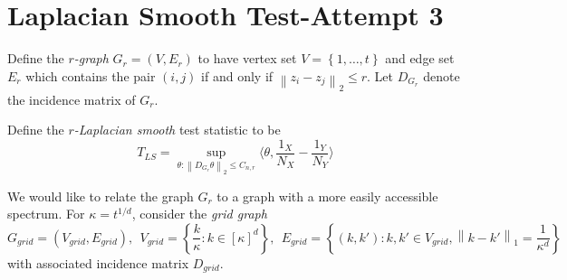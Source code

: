 \documentclass{article}
\newcommand{\norm}[1]{\left\lVert#1\right\rVert}
\newcommand{\set}[1]{\left\{#1\right\}}
\newcommand{\dotp}[2]{\langle #1, #2 \rangle}
\newcommand{\1}{\mathbb{I}}
\theoremstyle{alden}
\theoremstyle{aldenthm}
\theoremstyle{definition}
\theoremstyle{remark}
\begin{document}
	
\section{Laplacian Smooth Test-Attempt 3}
Define the \emph{$r$-graph} $G_r = (V,E_r)$ to have vertex set $V = \set{1,\ldots,t}$ and edge set $E_r$ which contains the pair $(i,j)$ if and only if $\norm{z_i - z_j}_2 \leq r$. Let $D_{G_r}$ denote the incidence matrix of $G_r$. 

Define the \emph{$r$-Laplacian smooth} test statistic to be
\begin{equation*}
T_{LS} = \sup_{\theta: \norm{D_{G_r}\theta}_2 \leq C_{n,r}} \dotp{\theta}{\frac{1_X}{N_X} - \frac{1_Y}{N_Y}}
\end{equation*}

We would like to relate the graph $G_r$ to a graph with a more easily accessible spectrum. For $\kappa = t^{1/d}$, consider the \emph{grid graph}
\begin{equation*}
G_{grid} = (V_{grid},E_{grid}),~~ V_{grid} = \set{\frac{k}{\kappa}: k \in [\kappa]^d},~~ E_{grid} = \set{(k,k'): k, k' \in V_{grid}, \norm{k - k'}_1 = \frac{1}{\kappa^d}}
\end{equation*}
with associated incidence matrix $D_{grid}$.
\end{document}

